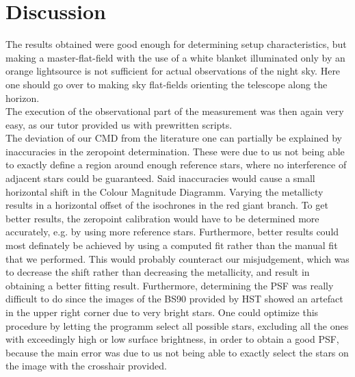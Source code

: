 \section{Discussion}
The results obtained were good enough for determining setup characteristics, but making a master-flat-field with the use of a white blanket illuminated only by an orange lightsource is not sufficient for actual observations of the night sky. Here one should go over to making sky flat-fields orienting the telescope along the horizon.\\
The execution of the observational part of the measurement was then again very easy, as our tutor provided us with prewritten scripts.\\
The deviation of our CMD from the literature one can partially be explained by inaccuracies in the zeropoint determination. These were due to us not being able to exactly define a region around enough reference stars, where no interference of adjacent stars could be guaranteed. Said inaccuracies would cause a small horizontal shift in the Colour Magnitude Diagramm. Varying the metallicty results in a horizontal offset of the isochrones in the red giant branch. To get better results, the zeropoint calibration would have to be determined more accurately, e.g. by using more reference stars. Furthermore, better results could most definately be achieved by using a computed fit rather than the manual fit that we performed. This would probably counteract our misjudgement, which was to decrease the shift rather than decreasing the metallicity, and result in obtaining a better fitting result. Furthermore, determining the PSF was really difficult to do since the images of the BS90 provided by HST showed an artefact in the upper right corner due to very bright stars. One could optimize this procedure by letting the programm select all possible stars, excluding all the ones with exceedingly high or low surface brightness, in order to obtain a good PSF, because the main error was due to us not being able to exactly select the stars on the image with the crosshair provided.\\
